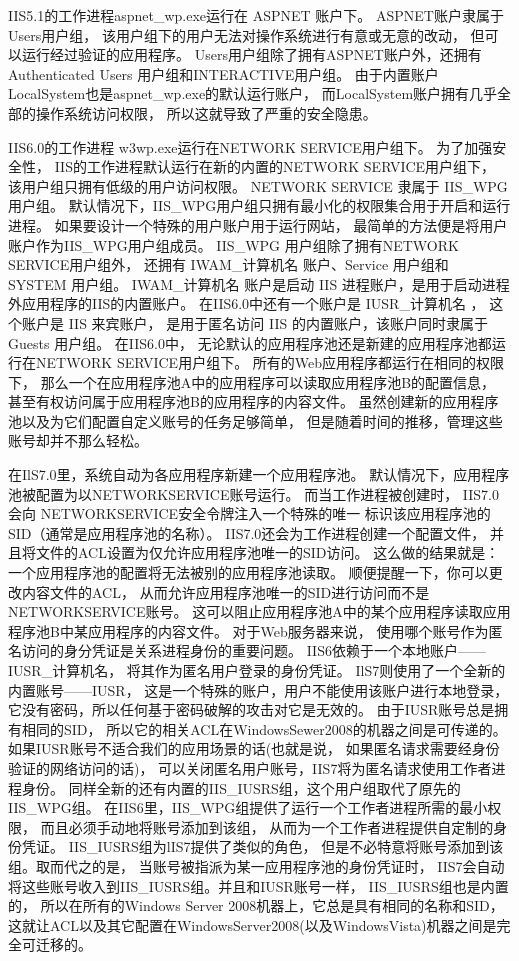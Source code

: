 \documentclass{book}
\begin{document}
IIS5.1的工作进程aspnet\_wp.exe运行在 ASPNET 账户下。
ASPNET账户隶属于Users用户组，
该用户组下的用户无法对操作系统进行有意或无意的改动，
但可以运行经过验证的应用程序。
Users用户组除了拥有ASPNET账户外，还拥有 Authenticated Users 用户组和INTERACTIVE用户组。
由于内置账户LocalSystem也是aspnet\_wp.exe的默认运行账户，
而LocalSystem账户拥有几乎全部的操作系统访问权限，
所以这就导致了严重的安全隐患。

IIS6.0的工作进程 w3wp.exe运行在NETWORK SERVICE用户组下。
为了加强安全性，
IIS的工作进程默认运行在新的内置的NETWORK SERVICE用户组下，
该用户组只拥有低级的用户访问权限。
NETWORK SERVICE 隶属于 IIS\_WPG 用户组。
默认情况下，IIS\_WPG用户组只拥有最小化的权限集合用于开启和运行进程。
如果要设计一个特殊的用户账户用于运行网站，
最简单的方法便是将用户账户作为IIS\_WPG用户组成员。
IIS\_WPG 用户组除了拥有NETWORK SERVICE用户组外，
还拥有 IWAM\_计算机名 账户、Service 用户组和 SYSTEM 用户组。
IWAM\_计算机名 账户是启动 IIS 进程账户，是用于启动进程外应用程序的IIS的内置账户。
在IIS6.0中还有一个账户是 IUSR\_计算机名 ，
这个账户是 IIS 来宾账户，
是用于匿名访问 IIS 的内置账户，该账户同时隶属于 Guests 用户组。
在IIS6.0中，
无论默认的应用程序池还是新建的应用程序池都运行在NETWORK SERVICE用户组下。
所有的Web应用程序都运行在相同的权限下，
那么一个在应用程序池A中的应用程序可以读取应用程序池B的配置信息，
甚至有权访问属于应用程序池B的应用程序的内容文件。
虽然创建新的应用程序池以及为它们配置自定义账号的任务足够简单，
但是随着时间的推移，管理这些账号却并不那么轻松。

在IlS7.0里，系统自动为各应用程序新建一个应用程序池。
默认情况下，应用程序池被配置为以NETWORKSERVICE账号运行。
而当工作进程被创建时，
IIS7.0会向 NETWORKSERVICE安全令牌注入一个特殊的唯一
标识该应用程序池的SID（通常是应用程序池的名称）。
IIS7.0还会为工作进程创建一个配置文件，
并且将文件的ACL设置为仅允许应用程序池唯一的SID访问。
这么做的结果就是：一个应用程序池的配置将无法被别的应用程序池读取。
顺便提醒一下，你可以更改内容文件的ACL，
从而允许应用程序池唯一的SID进行访问而不是NETWORKSERVICE账号。
这可以阻止应用程序池A中的某个应用程序读取应用程序池B中某应用程序的内容文件。
对于Web服务器来说，
使用哪个账号作为匿名访问的身分凭证是关系进程身份的重要问题。
IIS6依赖于一个本地账户——IUSR\_计算机名，
将其作为匿名用户登录的身份凭证。
IlS7则使用了一个全新的内置账号——IUSR，
这是一个特殊的账户，用户不能使用该账户进行本地登录，
它没有密码，所以任何基于密码破解的攻击对它是无效的。
由于IUSR账号总是拥有相同的SID，
所以它的相关ACL在WindowsSewer2008的机器之间是可传递的。
如果IUSR账号不适合我们的应用场景的话(也就是说，
如果匿名请求需要经身份验证的网络访问的话)，
可以关闭匿名用户账号，IIS7将为匿名请求使用工作者进程身份。
同样全新的还有内置的IIS\_IUSRS组，这个用户组取代了原先的IIS\_WPG组。
在IIS6里，IIS\_WPG组提供了运行一个工作者进程所需的最小权限，
而且必须手动地将账号添加到该组，
从而为一个工作者进程提供自定制的身份凭证。
IIS\_IUSRS组为lIS7提供了类似的角色，
但是不必特意将账号添加到该组。取而代之的是，
当账号被指派为某一应用程序池的身份凭证时，
IIS7会自动将这些账号收入到IIS\_IUSRS组。并且和IUSR账号一样，
IIS\_IUSRS组也是内置的，
所以在所有的Windows Server 2008机器上，它总是具有相同的名称和SID，
这就让ACL以及其它配置在WindowsServer2008(以及WindowsVista)机器之间是完全可迁移的。
\end{document}
